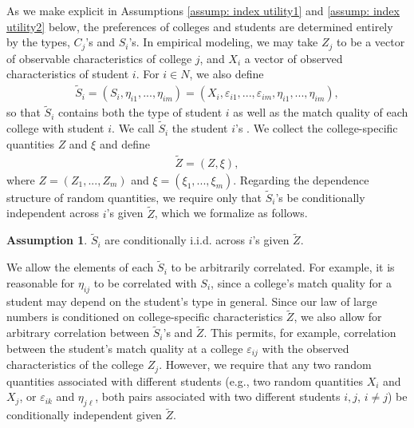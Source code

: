 \documentclass[12pt, fullpage]{amsart}
\theoremstyle{definition}
\theoremstyle{definition}
\newtheorem{assumption}{Assumption}[section]
\theoremstyle{definition}
\begin{document}
\begin{bibunit}[econometrica]
As we make explicit in Assumptions \ref{assump: index utility1} and \ref{assump: index utility2} below, the preferences of colleges and students are determined entirely by the types, $C_j$'s and $S_i$'s. In empirical modeling, we may take $Z_j$ to be a vector of observable characteristics of college $j$, and $X_i$ a vector of observed characteristics of student $i$. For $i\in N $, we also define 
\begin{align*}
	\tilde S_i = (S_i, \eta_{i1},...,\eta_{im}) = (X_i, \varepsilon_{i1},...,\varepsilon_{im},\eta_{i1},...,\eta_{im}),
\end{align*}	
so that $\tilde S_i$ contains both the type of student $i$ as well as the match quality of each college with student $i$. We call $\tilde S_i$ the student $i$'s . We collect the college-specific quantities $Z$ and $\xi$ and define
\begin{align}
	\label{tilde Z}
	\tilde Z = (Z,\xi),
\end{align}
where $Z = (Z_1,...,Z_m)$ and $\xi = (\xi_1,...,\xi_m)$. Regarding the dependence structure of random quantities, we require only that $\tilde S_i$'s be conditionally independent across $i$'s given $\tilde Z$, which we formalize as follows.
\begin{assumption}
	\label{assump: index utility cond ind} 
	$\tilde{S}_{i}$ are conditionally i.i.d. across $i$'s given $\tilde Z$.
\end{assumption}
We allow the elements of each $\tilde S_i$ to be arbitrarily correlated.  For example, it is reasonable for $\eta_{ij}$ to be correlated with $S_i$, since a college's match quality for a student may depend on the student's type in general. Since our law of large numbers is conditioned on college-specific characteristics $\tilde Z$, we also allow for arbitrary correlation between $\tilde S_i$'s and $\tilde Z$. This permits, for example, correlation between the student's match quality at a college $\varepsilon_{ij}$ with the observed characteristics of the college $Z_j$. However, we require that any two random quantities associated with different students (e.g., two random quantities $X_i$ and $X_j$, or $\varepsilon_{ik}$ and $\eta_{j\ell}$, both pairs associated with two different students $i,j$, $i \ne j$) be conditionally independent given $\tilde Z$.


\end{bibunit}
\end{document}
